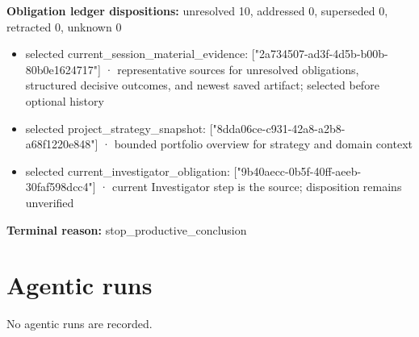 \documentclass[11pt]{article}
\begin{document}
\textbf{Obligation ledger dispositions:} unresolved 10, addressed 0, superseded 0, retracted 0, unknown 0\par
\begin{itemize}
\item selected current\_session\_material\_evidence: ["2a734507-ad3f-4d5b-b00b-80b0e1624717"] · representative sources for unresolved obligations, structured decisive outcomes, and newest saved artifact; selected before optional history
\item selected project\_strategy\_snapshot: ["8dda06ce-c931-42a8-a2b8-a68f1220e848"] · bounded portfolio overview for strategy and domain context
\item selected current\_investigator\_obligation: ["9b40aecc-0b5f-40ff-aeeb-30faf598dcc4"] · current Investigator step is the source; disposition remains unverified
\end{itemize}
\textbf{Terminal reason:} stop\_productive\_conclusion\par
\section{Agentic runs}
No agentic runs are recorded.\par
\end{document}
